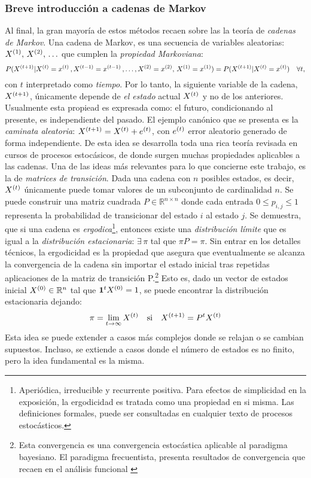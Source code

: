 \documentclass[../Main/Main.tex]{subfiles}
\begin{document}
\subsubsection{Breve introducción a cadenas de Markov}
Al final, la gran mayoría de estos métodos recaen sobre las la teoría de \textit{cadenas de Markov}. Una cadena de Markov, es una secuencia de variables aleatorias: $X^{(1)},\,X^{(2)},\,\ldots$ que cumplen la \textit{propiedad Markoviana}:
$$P(X^{(t+1)}|X^{(t)} = x^{(t)}\, ,X^{(t-1)} = x^{(t-1)}\,,\ldots,X^{(2)} = x^{(2)},\,X^{(1)} = x^{(1)}) = P(X^{(t+1)}|X^{(t)} = x^{(t)}) \quad\forall t,$$
con $t$ interpretado como \textit{tiempo}. Por lo tanto, la siguiente variable de la cadena, $X^{(t+1)}$, únicamente depende de \textit{el estado} actual $X^{(t)}$ y no de los anteriores. Usualmente esta propiead es expresada como: el futuro, condicionando al presente, es independiente del pasado. El ejemplo canónico que se presenta es la \textit{caminata aleatoria}: $X^{(t+1)} = X^{(t)} + e^{(t)}$, con $e^{(t)}$ error aleatorio generado de forma independiente. De esta idea se desarrolla toda una rica teoría revisada en cursos de procesos estocásicos, de donde surgen muchas propiedades aplicables a las cadenas\autocite{ross2009introduction}. Una de las ideas más relevantes para lo que concierne este trabajo, es la de \textit{matrices de transición}. Dada una cadena con $n$ posibles estados, es decir, $X^{(t)}$ únicamente puede tomar valores de un subconjunto de cardinalidad $n$. Se puede construir una matriz cuadrada $P\in\mathbb{R}^{n\times n}$ donde cada entrada $0\leq p_{i,j}\leq1$ representa la probabilidad de transicionar del estado $i$ al estado $j$. Se demuestra, que si una cadena es \textit{ergodica}\footnote{Aperiódica, irreducible y  recurrente positiva. Para efectos de simplicidad en la exposición, la ergodicidad es tratada como una propiedad en si misma. Las definiciones formales, puede ser consultadas en cualquier texto de procesos estocásticos.}, entonces existe una \textit{distribución límite} que es igual a la \textit{distribución estacionaria}: $\exists \,\pi$ tal que $\pi P = \pi$. Sin entrar en los detalles técnicos, la ergodicidad es la propiedad que asegura que eventualmente se alcanza la convergencia de la cadena sin importar el estado inicial tras repetidas aplicaciones de la matriz de transición P.\footnote{Esta convergencia es una convergencia estocástica aplicable al paradigma bayesiano. El paradigma frecuentista, presenta resultados de convergencia que recaen en el análisis funcional \autocite{stone1985additive}} Esto es, dado un vector de estados inicial $X^{(0)}\in\mathbb{R}^n$ tal que $\mathbf{1}^tX^{(0)} = 1$, se puede encontrar la distribución estacionaria dejando: 
\begin{align}
\pi = \lim_{t\rightarrow\infty} X^{(t)} \quad \text{si} \quad X^{(t+1)} = P^tX^{(t)} \label{ec:DistLimite}
\end{align}
Esta idea se puede extender a casos más complejos donde se relajan o se cambian supuestos. Incluso, se extiende a casos donde el número de estados es no finito, pero la idea fundamental es la misma. 
\end{document}
